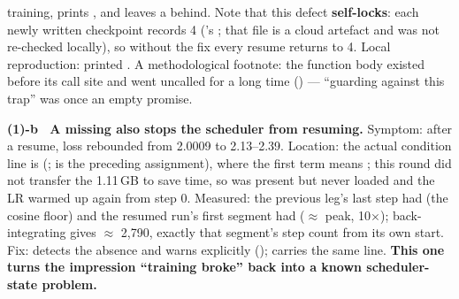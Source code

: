 \documentclass[11pt,openany]{article}
\begin{document}
training, prints , and leaves a \linebreak[0]\linebreak[0] behind. Note that
this defect \textbf{self-locks}: each newly written checkpoint records 4
(\linebreak[0]\linebreak[0]'s \linebreak[0]; that file is a cloud
artefact and was not re-checked locally), so without the fix every resume returns to 4. Local
reproduction: \linebreak[0]\linebreak[0]\linebreak[0] printed \linebreak[0]\linebreak[0].
A methodological footnote: the function body existed before its call site and went uncalled for a
long time (\linebreak[0]) --- ``guarding against this trap'' was once an empty promise.

\textbf{(1)-b \ A missing  also stops the scheduler from resuming.} Symptom:
after a resume, loss rebounded from 2.0009 to 2.13--2.39. Location: the actual condition line is
\linebreak[0]\linebreak[0]\linebreak[0]\linebreak[0]\linebreak[0]\linebreak[0]
(\linebreak[0];  is the preceding assignment), where the first term means
; this round did not transfer the 1.11\,GB  to save time, so
 was present but never loaded and the LR warmed up again from step 0. Measured:
the previous leg's last step had \linebreak[0]\linebreak[0] (the cosine floor) and the
resumed run's first segment had  ($\approx$ peak, 10$\times$); back-integrating
gives  $\approx$ 2{,}790, exactly that segment's step count from its own start.
Fix: \linebreak[0]\linebreak[0] detects the absence and warns explicitly
(\linebreak[0]); \linebreak[0] carries the same line. \textbf{This one turns
the impression ``training broke'' back into a known scheduler-state problem.}
\end{document}
